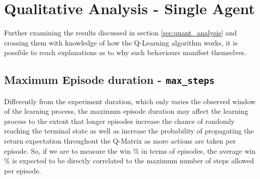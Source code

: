 \documentclass[11pt]{article}
\begin{document}
\section{Qualitative Analysis - Single Agent}
    Further examining the results discussed in section \ref{sec:quant_analysis} and crossing them with knowledge of how the Q-Learning algorithm works, it is possible to reach explanations as to why such behaviours manifest themselves.

    \subsection{Maximum Episode duration - \texttt{max\_steps}}
        Differently from the experiment duration, which only varies the observed window of the learning process, the maximum episode duration may affect the learning process to the extent that longer episodes increase the chance of randomly reaching the terminal state as well as increase the probability of propagating the return expectation throughout the Q-Matrix as more actions are taken per episode. So, if we are to measure the win \% in terms of episodes, the average win \% is expected to be directly correlated to the maximum number of steps allowed per episode.
\end{document}
